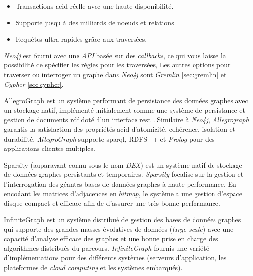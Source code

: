     \begin{itemize}\renewcommand\labelitemi{--}
    \item Transactions \acrshort{acid} réelle avec une haute disponibilité.
    \item Supporte jusqu'à des milliards de noeuds et relations.
    \item Requêtes ultra-rapides grâce aux traversées.
    \end{itemize}
    \enddescription
    \medskip

    \textit{Neo4j} est fourni avec une \textit{API} basée sur des
    \textit{callbacks}, ce qui vous laisse la possibilité de spécifier
    les règles pour les traversées, Les autres options pour traverser
    ou interroger un graphe dans \textit{Neo4j} sont \textit{Gremlin}
    \ref{sec:gremlin} et \textit{Cypher} \ref{sec:cypher}.\bigskip

    \textsf{AllegroGraph} \cite{allegrograph} est un système performant
    de persistance des données graphes avec un stockage natif,
    implémenté initialement comme une système de persistance et
    gestion de documents \acrshort{rdf} doté d'un interface
    \acrshort{rest} \cite{fielding2000architectural}. Similaire à
    \emph{Neo4j}, \emph{Allegrograph} garantis la satisfaction des
    propriétés \acrshort{acid} d'atomicité, cohérence, isolation et
    durabilité. \emph{AllegroGraph} supporte \acrshort{sparql}, RDFS++
    et \textit{Prolog} pour des applications clientes
    multiples.\bigskip

    \textsf{Sparsity} \cite{sparksee} (auparavant connu sous le nom
    \emph{DEX}) est un système natif de stockage de données graphes
    persistants et temporaires. \emph{Sparsity} focalise sur la
    gestion et l'interrogation des géantes bases de données graphes à
    haute performance. En encodant les matrices d'adjacences en
    \emph{bitmap}, le système a une gestion d'espace disque compact et
    efficace afin de d'assurer une très bonne performance.\medskip
    \newpage

    \textsf{InfiniteGraph} \cite{infinitegraph} est un système
    distribué de gestion des bases de données graphes qui supporte des
    grandes masses évolutives de données (\emph{large-scale}) avec une
    capacité d'analyse efficace des graphes et une bonne prise en
    charge des algorithmes distribués du
    parcours. \emph{InfiniteGraph} fournis une variété
    d'implémentations pour des différents systèmes (serveurs
    d'application, les plateformes de \emph{cloud computing} et les
    systèmes embarqués).

